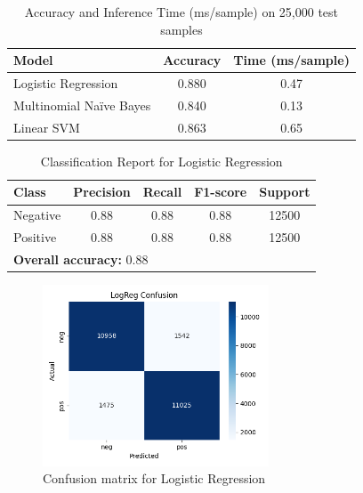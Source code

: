 \documentclass[12pt,a4paper]{article}
\begin{document}
\begin{table}[H]
  \centering
  \caption{Accuracy and Inference Time (ms/sample) on 25,000 test samples}
  \label{tab:classical-summary}
  \begin{tabular}{lcc}
    \toprule
    \textbf{Model}          & \textbf{Accuracy} & \textbf{Time (ms/sample)} \\
    \midrule
    Logistic Regression     & 0.880             & 0.47                     \\
    Multinomial Naïve Bayes & 0.840             & 0.13                     \\
    Linear SVM              & 0.863             & 0.65                     \\
    \bottomrule
  \end{tabular}
\end{table}

\begin{table}[H]
  \centering
  \caption{Classification Report for Logistic Regression}
  \begin{tabular}{lcccc}
    \toprule
    \textbf{Class} & \textbf{Precision} & \textbf{Recall} & \textbf{F1-score} & \textbf{Support} \\
    \midrule
    Negative & 0.88 & 0.88 & 0.88 & 12500 \\
    Positive & 0.88 & 0.88 & 0.88 & 12500 \\
    \midrule
    \multicolumn{5}{l}{\textbf{Overall accuracy:} 0.88} \\
    \bottomrule
  \end{tabular}
\end{table}

\begin{figure}[H]
  \centering
  \includegraphics[width=0.6\textwidth]{figures/LogReg_confusion.png}
  \caption{Confusion matrix for Logistic Regression}
\end{figure}
\end{document}
